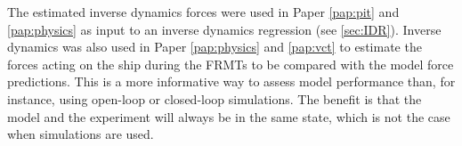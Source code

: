 The estimated inverse dynamics forces were used in Paper \ref{pap:pit} and \ref{pap:physics} as input to an inverse dynamics regression (see \autoref{sec:IDR}). 
Inverse dynamics was also used in Paper \ref{pap:physics} and \ref{pap:vct} to estimate the forces acting on the ship during the FRMTs to be compared with the model force predictions. This is a more informative way to assess model performance than, for instance, using open-loop or closed-loop simulations. The benefit is that the model and the experiment will always be in the same state, which is not the case when simulations are used.